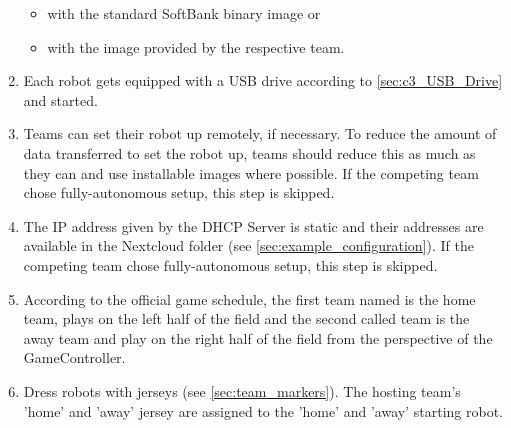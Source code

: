 \begin{enumerate}
        \begin{itemize}
            \item with the standard SoftBank binary image or
            \item with the image provided by the respective team.
		\end{itemize}
		\item Each robot gets equipped with a USB drive according to \ref{sec:c3_USB_Drive} and started.
        \item Teams can set their robot up remotely, if necessary. To reduce the amount of data transferred to set the robot up, teams should reduce this as much as they can and use installable images where possible. If the competing team chose fully-autonomous setup, this step is skipped.
        \item The IP address given by the DHCP Server is static and their addresses are available in the Nextcloud folder (see \ref{sec:example_configuration}). If the competing team chose fully-autonomous setup, this step is skipped.
        \item According to the official game schedule, the first team named is the home team, plays on the left half of the field and the second called team is the away team and play on the right half of the field from the perspective of the GameController. 
        \item Dress robots with jerseys (see \ref{sec:team_markers}). The hosting team's 'home' and 'away' jersey are assigned to the 'home' and 'away' starting robot. 
    \end{enumerate}

